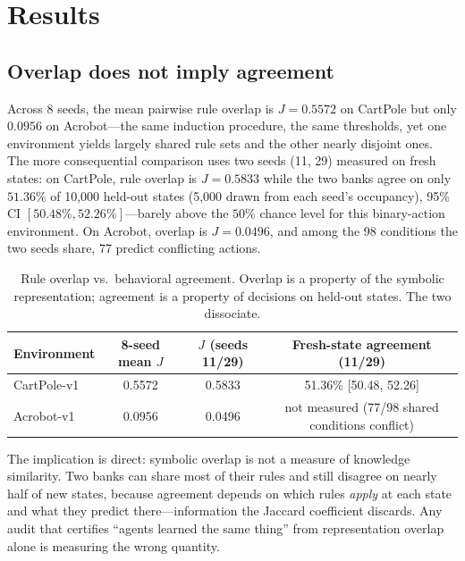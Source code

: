 \documentclass[11pt]{article}
\begin{document}
\section{Results}

\subsection{Overlap does not imply agreement}
\label{sec:overlap}

Across 8 seeds, the mean pairwise rule overlap is $J = 0.5572$ on CartPole but only $0.0956$ on Acrobot---the same induction procedure, the same thresholds, yet one environment yields largely shared rule sets and the other nearly disjoint ones. The more consequential comparison uses two seeds (11, 29) measured on fresh states: on CartPole, rule overlap is $J = 0.5833$ while the two banks agree on only $51.36\%$ of 10,000 held-out states (5,000 drawn from each seed's occupancy), 95\% CI $[50.48\%, 52.26\%]$---barely above the $50\%$ chance level for this binary-action environment. On Acrobot, overlap is $J = 0.0496$, and among the 98 conditions the two seeds share, 77 predict conflicting actions.

\begin{table}[t]
\centering
\caption{Rule overlap vs.\ behavioral agreement. Overlap is a property of the symbolic representation; agreement is a property of decisions on held-out states. The two dissociate.}
\label{tab:overlap}
\begin{tabular*}{\textwidth}{@{\extracolsep{\fill}}lccc@{}}
\toprule
Environment & 8-seed mean $J$ & $J$ (seeds 11/29) & Fresh-state agreement (11/29) \\
\midrule
CartPole-v1 & 0.5572 & 0.5833 & 51.36\% [50.48, 52.26] \\
Acrobot-v1 & 0.0956 & 0.0496 & not measured (77/98 shared conditions conflict) \\
\bottomrule
\end{tabular*}
\end{table}

The implication is direct: symbolic overlap is not a measure of knowledge similarity. Two banks can share most of their rules and still disagree on nearly half of new states, because agreement depends on which rules \textit{apply} at each state and what they predict there---information the Jaccard coefficient discards. Any audit that certifies ``agents learned the same thing'' from representation overlap alone is measuring the wrong quantity.
\end{document}
